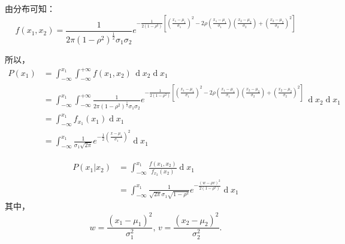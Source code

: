 \documentclass[UTF8,a4paper,AutoFakeBold,AutoFakeSlant]{article}
\begin{document}
由分布可知：
\begin{equation*}
  f\left(x_{1}, x_{2}\right)=\frac{1}{2 \pi\left(1-\rho^{2}\right)^{\frac{1}{2}} \sigma_{1} \sigma_{2}} e^{-\frac{1}{2\left(1-\rho^{2}\right)}\left[\left(\frac{x_{1}-\mu_{1}}{\sigma_{1}}\right)^{2}-2 \rho\left(\frac{x_{1}-\mu_{1}}{\sigma_{1}}\right)\left(\frac{x_{2}-\mu_{2}}{\sigma_{2}}\right)+\left(\frac{x_{2}-\mu_{2}}{\sigma_{2}}\right)^{2}\right]}
\end{equation*}

所以，
\begin{equation*}
  \begin{aligned}
    P(x_1) & = \int_{-\infty}^{x_1} \int_{-\infty}^{+\infty} f\left(x_{1}, x_{2}\right) \,\operatorname{d}x_2 \operatorname{d}x_1                                                                                                                                                                                                                                                                                                           \\
           & =  \int_{-\infty}^{x_1} \int_{-\infty}^{+\infty} \frac{1}{2 \pi\left(1-\rho^{2}\right)^{\frac{1}{2}} \sigma_{1} \sigma_{2}} e^{-\frac{1}{2\left(1-\rho^{2}\right)}\left[\left(\frac{x_{1}-\mu_{1}}{\sigma_{1}}\right)^{2}-2 \rho\left(\frac{x_{1}-\mu_{1}}{\sigma_{1}}\right)\left(\frac{x_{2}-\mu_{2}}{\sigma_{2}}\right)+\left(\frac{x_{2}-\mu_{2}}{\sigma_{2}}\right)^{2}\right]} \,\operatorname{d}x_2 \operatorname{d}x_1 \\
           & = \int_{-\infty}^{x_1} f_{x_1}(x_1) \operatorname{d}x_1                                                                                                                                                                                                                                                                                                                                                                        \\
           & = \int_{-\infty}^{x_1} \frac{1}{\sigma_1 \sqrt{2 \pi}} e^{-\frac{1}{2}\left(\frac{x-\mu_1}{\sigma_1}\right)^{2}} \operatorname{d}x_1
  \end{aligned}
\end{equation*}

\begin{equation*}
  \begin{aligned}
    P(x_1|x_2) & =  \int_{-\infty}^{x_1}  \frac{f(x_1,x_2)}{f_{x_2}(x_2)}  \operatorname{d}x_1                                                     \\
               & =  \int_{-\infty}^{x_1}  \frac{1}{\sqrt{2\pi}\sigma_1\sqrt{1-\rho^2}} e^{-\frac{(w-\rho v)^2}{2(1-\rho^2)}}   \operatorname{d}x_1
  \end{aligned}
\end{equation*}
其中，
\begin{equation*}
  w = \frac{(x_1-\mu_1)^2}{\sigma_1^2}, \, v = \frac{(x_2-\mu_2)^2}{\sigma_2^2}.
\end{equation*}
\end{document}
